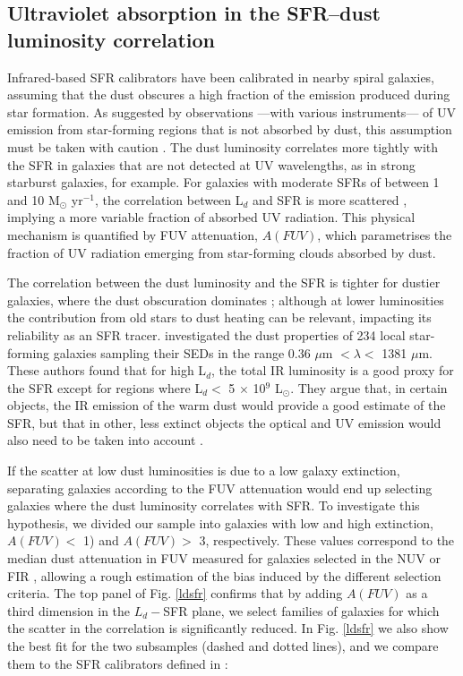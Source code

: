 \documentclass{aa}
\begin{document}
\subsection{Ultraviolet absorption in the SFR--dust luminosity correlation}

Infrared-based SFR calibrators have been calibrated in nearby spiral galaxies, assuming that the dust obscures a high fraction of the emission produced during star formation. As suggested by observations ---with various instruments--- of UV emission from star-forming regions that is not absorbed by dust, this assumption must be taken with caution \citep{hir}. The dust luminosity correlates more tightly with the SFR in galaxies that are not detected at UV wavelengths, as in strong starburst galaxies, for example. For galaxies with moderate SFRs of between 1 and 10 M$_\odot$ yr$^{-1}$, the correlation between L$_{d}$ and SFR is more scattered \citep{smi}, implying a more variable fraction of absorbed UV radiation. This physical mechanism is quantified by FUV attenuation, $A(FUV)$, which parametrises the fraction of UV radiation emerging from star-forming clouds absorbed by dust.

The correlation between the dust luminosity and the SFR is tighter for dustier galaxies, where the dust obscuration dominates \citep[see also][]{cle,pap2}; although at lower luminosities the contribution from old stars to dust heating can be relevant, impacting its reliability as an SFR tracer. \citealt{cle} investigated the dust properties of 234 local star-forming galaxies sampling their SEDs in the range 0.36 $\mu$m $< \lambda <$ 1381 $\mu$m. These authors found that for high L$_{d}$, the total IR luminosity is a good proxy for the SFR except for regions where L$_{d} <$ 5 $\times$ 10$^9$ L$_\odot$. They argue that, in certain objects, the IR emission of the warm dust would provide a good estimate of the SFR, but that in other, less extinct objects the optical and UV emission would also need to be taken into account \citep[see Fig. 9 in][]{cle}.

If the scatter at low dust luminosities is due to a low galaxy extinction, separating galaxies according to the FUV attenuation would end up selecting galaxies where the dust luminosity correlates with SFR. To investigate this hypothesis, we divided our sample into galaxies with low and high extinction, $A(FUV) <$ 1) and $A(FUV) >$ 3, respectively. These values correspond to the median dust attenuation in FUV measured for galaxies selected in the NUV or FIR \citep{bua,bur}, allowing a rough estimation of the bias induced by the different selection criteria. The top panel of Fig. \ref{ldsfr} confirms that by adding $A(FUV)$ as a third dimension in the $L_d-$SFR plane, we select families of galaxies for which the scatter in the correlation is significantly reduced. In Fig. \ref{ldsfr} we also show the best fit for the two subsamples (dashed and dotted lines), and we compare them to the SFR calibrators defined in \citealt{ken1}:
\end{document}
